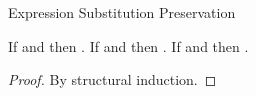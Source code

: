 \begin{lemma}{Expression Substitution Preservation}

\label{lemexp}

If \judeh{\envexte{\first{\varvarh}}{\first{\vartyh}}}{\first{\varexph}}{\second{\vartyh}} and \judeh{\env}{\second{\varexph}}{\first{\vartyh}} then \judeh{\env}{\expsubst{\first{\varexph}}{\second{\varexph}}{\first{\varvarh}}}{\second{\vartyh}}.  If \judem{\envexte{\first{\varvarm}}{\first{\vartym}}}{\first{\varexpm}}{\second{\vartym}} and \judem{\env}{\second{\varexpm}}{\first{\vartym}} then \judem{\env}{\expsubst{\first{\varexpm}}{\second{\varexpm}}{\first{\varvarm}}}{\second{\vartym}}.  If \judes{\envexte{\first{\varvars}}{\tytst}}{\first{\varexps}}{\tytst} and \judes{\env}{\second{\varexps}}{\tytst} then \judes{\env}{\expsubst{\first{\varexps}}{\second{\varexps}}{\first{\varvars}}}{\tytst}.

\begin{proof}

By structural induction.

\end{proof}

\end{lemma}
